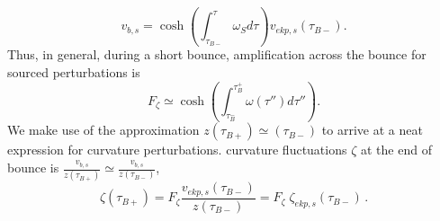 \documentclass[12pt,a4paper]{article}
\numberwithin{equation}{section}
\numberwithin{equation}{section}
\begin{document}
\begin{equation}
   v_{b,s} = \cosh\left(\int_{\tau_{B-}}^{\tau} \omega_S d\tau\right) v_{ekp,s}(\tau_{B-})
    \label{eq:green1}.
\end{equation}
Thus, in general, during a short bounce, amplification across the bounce for sourced perturbations is 
\begin{equation}
F_{\zeta} \simeq \cosh(\int_{\tau_{B}^-}^{\tau_B^+} \omega(\tau'') d\tau'') .
\label{eq:zeta1}
\end{equation} 
We make use of the approximation $z(\tau_{B+})\simeq(\tau_{B-})$ to arrive at a neat expression for curvature perturbations. 
curvature fluctuations $\zeta$ at the end of bounce is $\frac{v_{b,s}}{z(\tau_{B+})} \simeq\frac{v_{b,s}}{z(\tau_{B-})} $, 
\begin{equation}
\zeta(\tau_{B+}) = F_{\zeta}  \frac{v_{ekp,s}(\tau_{B-}) }{z(\tau_{B-})} 
 = F_{\zeta} \; \zeta_{ekp,s}(\tau_{B-}) \, .
\label{eq:timei}
\end{equation}
\end{document}
